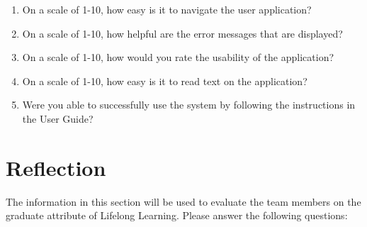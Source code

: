 \documentclass[12pt, titlepage]{article}
\begin{document}

\begin{enumerate}

\item On a scale of 1-10, how easy is it to navigate the user application?

\item On a scale of 1-10, how helpful are the error messages that are displayed?

\item On a scale of 1-10, how would you rate the usability of the application?

\item On a scale of 1-10, how easy is it to read text on the application?

\item Were you able to successfully use the system by following the instructions in the User Guide?

\end{enumerate}

\newpage{}
\section{Reflection}

The information in this section will be used to evaluate the team members on the
graduate attribute of Lifelong Learning.  Please answer the following questions:
\end{document}
